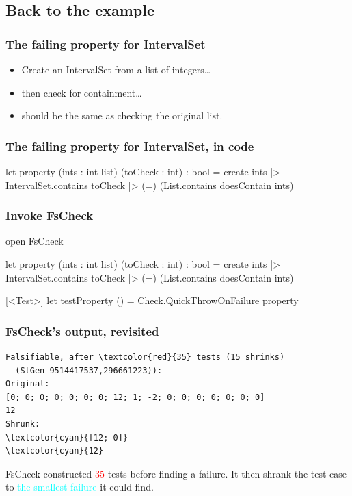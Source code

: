 \documentclass{beamer}
\begin{document}
\subsection{Back to the example}

\begin{frame}
\frametitle{The failing property for IntervalSet}
\begin{itemize}
\item Create an IntervalSet from a list of integers\dots
\item then check for containment\dots
\item should be the same as checking the original list.
\end{itemize}
\end{frame}

\begin{frame}[fragile]
\frametitle{The failing property for IntervalSet, in code}
\begin{fslisting}
let property (ints : int list) (toCheck : int) : bool =
    create ints
    |> IntervalSet.contains toCheck
    |> (=) (List.contains doesContain ints)
\end{fslisting}

\end{frame}

\begin{frame}[fragile]
\frametitle{Invoke FsCheck}
\begin{fslisting}
open FsCheck

let property (ints : int list) (toCheck : int) : bool =
    create ints
    |> IntervalSet.contains toCheck
    |> (=) (List.contains doesContain ints)

[<Test>]
let testProperty () =
    Check.QuickThrowOnFailure property
\end{fslisting}

\end{frame}

\begin{frame}[fragile]
\frametitle{FsCheck's output, revisited}
\begin{Verbatim}[commandchars=\\\{\}]
Falsifiable, after \textcolor{red}{35} tests (15 shrinks)
  (StGen 9514417537,296661223)):
Original:
[0; 0; 0; 0; 0; 0; 0; 12; 1; -2; 0; 0; 0; 0; 0; 0; 0]
12
Shrunk:
\textcolor{cyan}{[12; 0]}
\textcolor{cyan}{12}
\end{Verbatim}

\hfill \break

FsCheck constructed \textcolor{red}{35} tests before finding a failure.
It then shrank the test case to \textcolor{cyan}{the smallest failure} it could find.
\end{frame}
\end{document}
